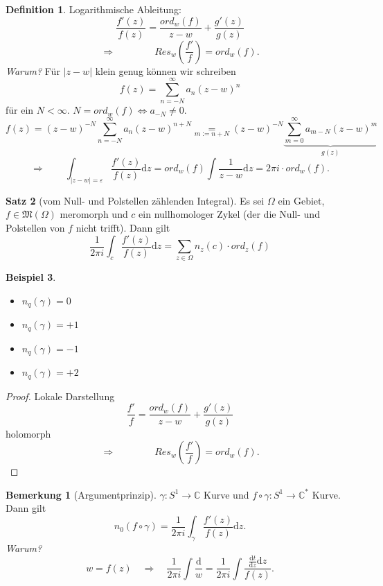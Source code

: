 \documentclass[11pt,titlepage]{article}
\theoremstyle{definition}
\newtheorem{theorem}{Satz}[section]
\newtheorem{definition}[theorem]{Definition}
\newtheorem{example}[theorem]{Beispiel}
\newtheorem{remark}{Bemerkung}
\theoremstyle{remark}
\begin{document}
	\begin{definition}
		Logarithmische Ableitung:
		\[ \frac{f'(z)}{f(z)}=\frac{ord_w(f)}{z-w}+\frac{g'(z)}{g(z)} \]
		\[ \Rightarrow \qquad \qquad Res_w\left(\frac{f'}{f}\right)=ord_w(f). \]
		\textsl{Warum?} Für $|z-w|$ klein genug können wir schreiben
		\[ f(z)=\sum_{n=-N}^{\infty} a_n(z-w)^n \]
		für ein $N<\infty$. $N=ord_w(f) \Leftrightarrow a_{-N}\neq 0$.
		\[ f(z)=(z-w)^{-N}\sum_{n=-N}^{\infty} a_n(z-w)^{n+N} \underset{m:=n+N}{=}
		(z-w)^{-N} \underbrace{\sum_{m=0}^{\infty}a_{m-N}	(z-w)^m}_{g(z)}	\]
		\[ \Rightarrow \qquad \int_{|z-w|=\varepsilon} \frac{f'(z)}{f(z)} \mathrm{d}z =
		ord_w(f) \int \frac{1}{z-w}\mathrm{d}z =2\pi i \cdot ord_w(f). \]
	\end{definition}
	
	\begin{theorem}[vom Null- und Polstellen zählenden Integral]
		Es sei $\Omega$ ein Gebiet, $f\in\mathfrak{M}(\Omega)$ meromorph und $c$ ein nullhomologer 
		Zykel (der die Null- und Polstellen von $f$ nicht trifft). Dann gilt
		\[ \frac{1}{2\pi i} \int_c \frac{f'(z)}{f(z)}\mathrm{d}z =\sum_{z\in\Omega} n_z(c)\cdot ord_z(f) \]
	\end{theorem}
	
	\begin{example}
		\begin{itemize}
			\item $n_q(\gamma)=0$
			
			\item $n_q(\gamma)=+1$
			
			\item $n_q(\gamma)=-1$
			
			\item $n_q(\gamma)=+2$
		\end{itemize}
	\end{example}
	
	\begin{proof}
		Lokale Darstellung
		\[ \frac{f'}{f} =\frac{ord_w(f)}{z-w}+\frac{g'(z)}{g(z)} \]
		holomorph
		\[ \Rightarrow \qquad \qquad Res_w\left(\frac{f'}{f}\right)=ord_w(f).\]
	\end{proof}
	
	\begin{remark}[Argumentprinzip]
		$\gamma:S^1\to\mathbb{C}$ Kurve und $f\circ\gamma:S^1\to\mathbb{C}^*$ Kurve. Dann gilt
		\[ n_0(f\circ \gamma)=\frac{1}{2\pi i}\int_{\gamma} \frac{f'(z)}{f(z)}\mathrm{d}z. \]
		\textsl{Warum?}
		\[ w =f(z) \quad \Rightarrow \quad \frac{1}{2\pi i} \int \frac{\mathrm{d}}{w}=\frac{1}{2\pi i} 
		\int \frac{\frac{\mathrm{d}t}{\mathrm{d}z} \mathrm{d}z}{f(z)}.\]
	\end{remark}
	
\end{document}
